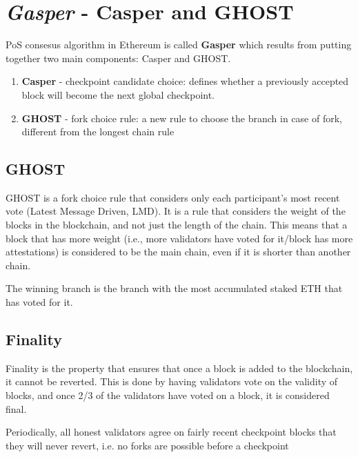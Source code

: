 \section{\textit{Gasper} - Casper and GHOST}
PoS consesus algorithm in Ethereum is called \textbf{Gasper} which results from putting together two main components: Casper and GHOST.
\begin{enumerate}
   \item \textbf{Casper} - checkpoint candidate choice:
   defines whether a previously accepted block will become the next global checkpoint.
   \item \textbf{GHOST} - fork choice rule:
   a new rule to choose the branch in case of fork, different from the longest chain rule
\end{enumerate}

\subsection{GHOST}
GHOST is a fork choice rule that considers only each participant's most recent vote (Latest Message Driven, LMD). It is a rule that considers the weight of the blocks in the blockchain, and not just the length of the chain. This means that a block that has more weight (i.e., more validators have voted for it/block has more attestations) is considered to be the main chain, even if it is shorter than another chain.

The winning branch is the branch with the most accumulated staked ETH that has voted for it.

\subsection{Finality}
Finality is the property that ensures that once a block is added to the blockchain, it cannot be reverted. This is done by having validators vote on the validity of blocks, and once 2/3 of the validators have voted on a block, it is considered final.


Periodically, all honest validators agree on fairly recent checkpoint blocks that they will never revert, i.e. no forks are possible before a checkpoint